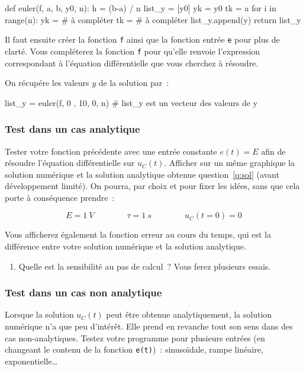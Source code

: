 \documentclass[../main/main.tex]{subfiles}
\begin{document}
\begin{python}
def euler(f, a, b, y0, n):
  h = (b-a) / n
  list_y = [y0]
  yk = y0
  tk = a
  for i in range(n):
    yk = # à compléter
    tk = # à compléter
    list_y.append(y)
  return list_y
\end{python}

Il faut ensuite créer la fonction \texttt{f} ainsi que la fonction entrée
\texttt{e} pour plus de clarté. Vous compléterez la fonction \texttt{f} pour
qu'elle renvoie l'expression correspondant à l'équation différentielle que vous
cherchez à résoudre.

%
%

On récupére les valeurs $y$ de la solution par~:
\begin{python}
list_y = euler(f, 0 , 10, 0, n) # list_y est un vecteur des valeurs de y
\end{python}

\subsubsection{Test dans un cas analytique}

Tester votre fonction précédente avec une entrée constante $e(t) = E$ afin de
résoudre l'équation différentielle sur $u_{C}(t)$. Afficher sur un même
graphique la solution numérique et la solution analytique obtenue
question~\ref{q:sol} (avant développement limité). On pourra, par choix et pour
fixer les idées, sans que cela porte à conséquence prendre~:

\[
  E = \SI{1}{V}
  \qquad \qquad
  \tau = \SI{1}{s}
  \qquad \qquad
  u_{C}(t=0) = 0
\]

Vous afficherez également la fonction erreur au cours du temps, qui est la
différence entre votre solution numérique et la solution analytique.
\begin{enumerate}[label=\sqenumi, start=12]
  \item Quelle est la sensibilité au pas de calcul~? Vous ferez plusieurs
    essais.
\end{enumerate}


\subsubsection{Test dans un cas non analytique}

Lorsque la solution $u_{C}(t)$ peut être obtenue analytiquement, la solution
numérique n'a que peu d'intérêt. Elle prend en revanche tout son sens dans des
cas non-analytiques.
\smallbreak
Testez votre programme pour plusieurs entrées (en changeant le contenu de la
fonction \texttt{e(t)})~: sinusoïdale, rampe linéaire, exponentielle…
\end{document}
